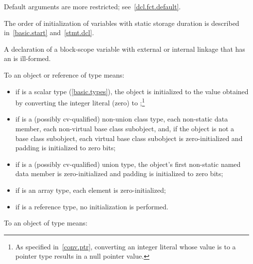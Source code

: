 \pnum
\begin{note}
Default arguments are more restricted; see~\ref{dcl.fct.default}.
\end{note}

\pnum
\begin{note}
The order of initialization of variables with static storage duration is described in~\ref{basic.start}
and~\ref{stmt.dcl}.
\end{note}

\pnum
A declaration of a block-scope variable with external or internal
linkage that has an  is ill-formed.

\pnum
{}%
%
%
%
%
To
an object or reference of type
means:

\begin{itemize}
\item
if
is a scalar type (\ref{basic.types}), the
object
is initialized to the value obtained by converting the integer literal 
(zero) to
;\footnote{As specified in~\ref{conv.ptr}, converting an integer
literal whose value is
to a pointer type results in a null pointer value.
}

\item
if
is a (possibly cv-qualified) non-union class type,
each non-static data member,
each non-virtual base class subobject, and,
if the object is not a base class subobject,
each virtual base class subobject
is zero-initialized and padding is initialized to zero bits;

\item
if
is a (possibly cv-qualified) union type,
the
object's first non-static named
data member
is zero-initialized and padding is initialized to zero bits;

\item
if
is an array type,
each element is zero-initialized;
\item
if
is a reference type, no initialization is performed.
\end{itemize}

\pnum
{}%
To
an object of type
means:

